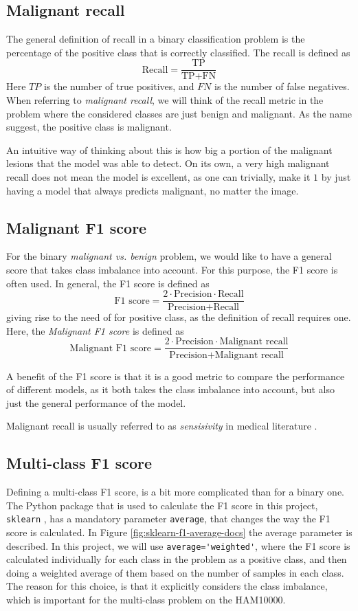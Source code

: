 \subsection{Malignant recall}
The general definition of recall in a binary classification problem is the percentage of the positive class
that is correctly classified.
The recall is defined as
\[
    \text{Recall} = \frac{\text{TP}}{\text{TP} + \text{FN}}
\]
Here $TP$ is the number of true positives, and $FN$ is the number of false negatives.
When referring to \textit{malignant recall}, we will think of the recall metric in the problem
where the considered classes are just benign and malignant.
As the name suggest, the positive class is malignant.

An intuitive way of thinking about this is how big a portion of the malignant lesions
that the model was able to detect.
On its own, a very high malignant recall does not mean the model is excellent,
as one can trivially, make it $1$ by just having a model that always predicts malignant, no matter the image.

\subsection{Malignant F1 score}
For the binary \textit{malignant vs. benign} problem, we would like to have a general score 
that takes class imbalance into account.
For this purpose, the F1 score is often used.
In general, the F1 score is defined as
\[
    \text{F1 score} = \frac{2 \cdot \text{Precision} \cdot \text{Recall}}{\text{Precision} + \text{Recall}}
\]
giving rise to the need of for positive class, as the definition of recall requires one.
Here, the \textit{Malignant F1 score} is defined as
\[
    \text{Malignant F1 score} = \frac{2\cdot \text{Precision} \cdot \text{Malignant recall}}{\text{Precision} + \text{Malignant recall}}
\]

A benefit of the F1 score is that it is a good metric to compare the performance of different models,
as it both takes the class imbalance into account,
but also just the general performance of the model.

Malignant recall is usually referred to as \textit{sensisivity} in medical literature
\cite{sensitivity-and-specificity}.

\subsection{Multi-class F1 score}
Defining a multi-class F1 score, is a bit more complicated than for a binary one.
The Python package that is used to calculate the F1 score in this project, \verb|sklearn|
\cite{sklearn}, has a mandatory parameter \verb|average|, that changes the way the F1 score is calculated.
In Figure \ref{fig:sklearn-f1-average-docs} the average parameter is described.
In this project, we will use \verb|average='weighted'|, where the F1 score is calculated
individually for each class in the problem as a positive class,
and then doing a weighted average of them based
on the number of samples in each class.
The reason for this choice,
is that it explicitly considers the class imbalance,
which is important for the multi-class problem on the HAM10000.


